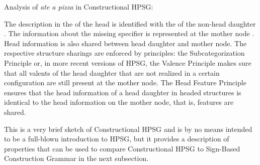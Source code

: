 \documentclass[output=paper,biblatex,babelshorthands,newtxmath,draftmode,colorlinks,citecolor=brown]{langscibook}
\begin{document}
\eas
\label{ex-ate-a-pizza-sag97}%
Analysis of \emph{ate a pizza} in Constructional HPSG:\\
\zs

\noindent
The description in the \compsl of the head is identified with the \synsemv of the non-head daughter
. The information about the missing specifier is represented at the mother node
. Head information is also shared between head daughter and mother node. The respective
structure sharings are enforced by principles: the Subcategorization Principle or, in more recent
versions of HPSG, the Valence Principle makes sure that all valents of the head daughter that are not
realized in a certain configuration are still present at the mother node. The Head Feature Principle
ensures that the head information of a head daughter in headed structures is identical to the head
information on the mother node, that is, \head features are shared.

This is a very brief sketch of Constructional HPSG and is by no means intended to be a full-blown
introduction to HPSG, but it provides a description of properties that can be used to compare
Constructional HPSG to Sign-Based Construction Grammar in the next subsection.
\end{document}
